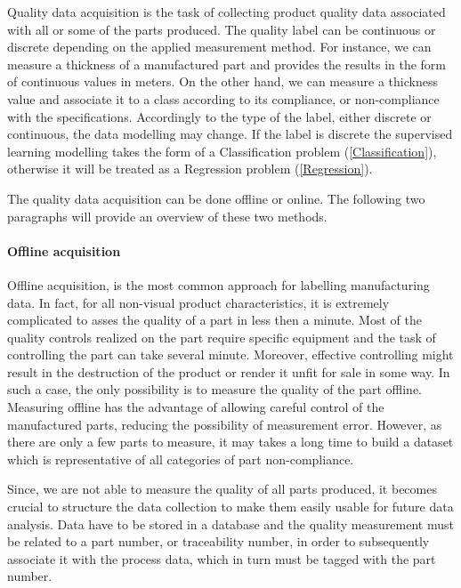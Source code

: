 Quality data acquisition is the task of collecting product quality data associated with all or some of the parts produced. The quality label can be continuous or discrete depending on the applied measurement method. For instance, we can measure a thickness of a manufactured part and provides the results in the form of continuous values in meters. On the other hand, we can measure a thickness value and associate it to  a class according to its compliance, or non-compliance with the specifications. Accordingly to the type of the label, either discrete or continuous, the data modelling may change. If the label is discrete the supervised learning modelling takes the form of a Classification problem (\ref{Classification}), otherwise it will be treated as a Regression problem (\ref{Regression}).   

The quality data acquisition can be done offline or online. The following two paragraphs will provide an overview of these two methods. 


\paragraph{Offline acquisition}

Offline acquisition, is the most common approach for labelling manufacturing data. In fact, for all non-visual product characteristics, it is extremely complicated to asses the quality of a part in less then a minute. Most of the quality controls realized on the part require specific equipment and the task of controlling the part can take several minute. Moreover, effective controlling might result in the destruction of the product or render it unfit for sale in some way. In such a case, the only possibility is to measure the quality of the part offline. Measuring offline has the advantage of allowing careful control of the manufactured parts, reducing the possibility of measurement error. However, as there are only a few parts to measure, it may takes a long time to build a dataset which is representative of all categories of part non-compliance.

Since, we are not able to measure the quality of all parts produced, it becomes crucial to structure the data collection to make them easily usable for future data analysis. Data have to be stored in a database and the quality measurement must be related to a part number, or traceability number, in order to subsequently associate it with the process data, which in turn must be tagged with the part number. 


